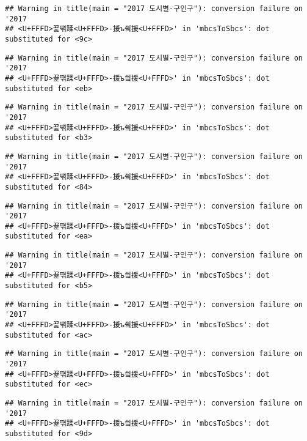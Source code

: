 \documentclass[]{article}
\begin{document}
\begin{verbatim}
## Warning in title(main = "2017 도시별-구인구"): conversion failure on '2017
## <U+FFFD>꾩떆蹂<U+FFFD>-援ъ씤援<U+FFFD>' in 'mbcsToSbcs': dot substituted for <9c>
\end{verbatim}

\begin{verbatim}
## Warning in title(main = "2017 도시별-구인구"): conversion failure on '2017
## <U+FFFD>꾩떆蹂<U+FFFD>-援ъ씤援<U+FFFD>' in 'mbcsToSbcs': dot substituted for <eb>
\end{verbatim}

\begin{verbatim}
## Warning in title(main = "2017 도시별-구인구"): conversion failure on '2017
## <U+FFFD>꾩떆蹂<U+FFFD>-援ъ씤援<U+FFFD>' in 'mbcsToSbcs': dot substituted for <b3>
\end{verbatim}

\begin{verbatim}
## Warning in title(main = "2017 도시별-구인구"): conversion failure on '2017
## <U+FFFD>꾩떆蹂<U+FFFD>-援ъ씤援<U+FFFD>' in 'mbcsToSbcs': dot substituted for <84>
\end{verbatim}

\begin{verbatim}
## Warning in title(main = "2017 도시별-구인구"): conversion failure on '2017
## <U+FFFD>꾩떆蹂<U+FFFD>-援ъ씤援<U+FFFD>' in 'mbcsToSbcs': dot substituted for <ea>
\end{verbatim}

\begin{verbatim}
## Warning in title(main = "2017 도시별-구인구"): conversion failure on '2017
## <U+FFFD>꾩떆蹂<U+FFFD>-援ъ씤援<U+FFFD>' in 'mbcsToSbcs': dot substituted for <b5>
\end{verbatim}

\begin{verbatim}
## Warning in title(main = "2017 도시별-구인구"): conversion failure on '2017
## <U+FFFD>꾩떆蹂<U+FFFD>-援ъ씤援<U+FFFD>' in 'mbcsToSbcs': dot substituted for <ac>
\end{verbatim}

\begin{verbatim}
## Warning in title(main = "2017 도시별-구인구"): conversion failure on '2017
## <U+FFFD>꾩떆蹂<U+FFFD>-援ъ씤援<U+FFFD>' in 'mbcsToSbcs': dot substituted for <ec>
\end{verbatim}

\begin{verbatim}
## Warning in title(main = "2017 도시별-구인구"): conversion failure on '2017
## <U+FFFD>꾩떆蹂<U+FFFD>-援ъ씤援<U+FFFD>' in 'mbcsToSbcs': dot substituted for <9d>
\end{verbatim}
\end{document}

